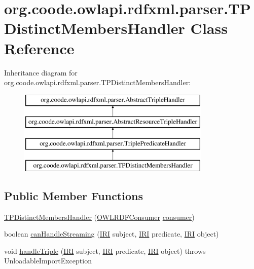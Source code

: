 \hypertarget{classorg_1_1coode_1_1owlapi_1_1rdfxml_1_1parser_1_1_t_p_distinct_members_handler}{\section{org.\-coode.\-owlapi.\-rdfxml.\-parser.\-T\-P\-Distinct\-Members\-Handler Class Reference}
\label{classorg_1_1coode_1_1owlapi_1_1rdfxml_1_1parser_1_1_t_p_distinct_members_handler}
}
Inheritance diagram for org.\-coode.\-owlapi.\-rdfxml.\-parser.\-T\-P\-Distinct\-Members\-Handler\-:\begin{figure}[H]
\begin{center}
\leavevmode
\includegraphics[height=4.000000cm]{classorg_1_1coode_1_1owlapi_1_1rdfxml_1_1parser_1_1_t_p_distinct_members_handler}
\end{center}
\end{figure}
\subsection*{Public Member Functions}
\begin{DoxyCompactItemize}
\item 
\hyperlink{classorg_1_1coode_1_1owlapi_1_1rdfxml_1_1parser_1_1_t_p_distinct_members_handler_a5198c2f1cf6b4d0908ee9b96ef2fcb49}{T\-P\-Distinct\-Members\-Handler} (\hyperlink{classorg_1_1coode_1_1owlapi_1_1rdfxml_1_1parser_1_1_o_w_l_r_d_f_consumer}{O\-W\-L\-R\-D\-F\-Consumer} \hyperlink{classorg_1_1coode_1_1owlapi_1_1rdfxml_1_1parser_1_1_abstract_triple_handler_a4ccf4d898ff01eb1cadfa04b23d54e9c}{consumer})
\item 
boolean \hyperlink{classorg_1_1coode_1_1owlapi_1_1rdfxml_1_1parser_1_1_t_p_distinct_members_handler_a81d123bd5dcfeda5a63a51e52e749da7}{can\-Handle\-Streaming} (\hyperlink{classorg_1_1semanticweb_1_1owlapi_1_1model_1_1_i_r_i}{I\-R\-I} subject, \hyperlink{classorg_1_1semanticweb_1_1owlapi_1_1model_1_1_i_r_i}{I\-R\-I} predicate, \hyperlink{classorg_1_1semanticweb_1_1owlapi_1_1model_1_1_i_r_i}{I\-R\-I} object)
\item 
void \hyperlink{classorg_1_1coode_1_1owlapi_1_1rdfxml_1_1parser_1_1_t_p_distinct_members_handler_a1da7b54ff16969352efa670f961388fa}{handle\-Triple} (\hyperlink{classorg_1_1semanticweb_1_1owlapi_1_1model_1_1_i_r_i}{I\-R\-I} subject, \hyperlink{classorg_1_1semanticweb_1_1owlapi_1_1model_1_1_i_r_i}{I\-R\-I} predicate, \hyperlink{classorg_1_1semanticweb_1_1owlapi_1_1model_1_1_i_r_i}{I\-R\-I} object)  throws Unloadable\-Import\-Exception 
\end{DoxyCompactItemize}
